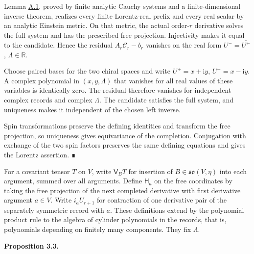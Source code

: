 \documentclass[
  english,
  11pt,
  reqno]{amsart}
\makeatletter
\newcommand{\pandocstatementheading}[1]{%
  \par\addpenalty{\@beginparpenalty}%
  \addvspace{.5\baselineskip plus .2\baselineskip minus .2\baselineskip}%
  {\normalfont\bfseries #1\par}%
  \nobreak\@afterindenttrue\@afterheading
}
\makeatother
\begin{document}
Lemma \hyperref[lem:es-finite-witness]{A.1}, proved by finite analytic
Cauchy systems and a finite-dimensional inverse theorem, realizes every
finite Lorentz-real prefix and every real scalar by an analytic Einstein
metric. On that metric, the actual order-\(r\) derivative solves the
full system and has the prescribed free projection. Injectivity makes it
equal to the candidate. Hence the residual \(A_r\mathcal C_r-b_r\)
vanishes on the real form \(U^-=\overline{U^+}\),
\(\Lambda\in\mathbb R\).

Choose paired bases for the two chiral spaces and write
\(U^+=x+\mathrm i y\), \(U^-=x-\mathrm i y\). A complex polynomial in
\((x,y,\Lambda)\) that vanishes for all real values of these variables
is identically zero. The residual therefore vanishes for independent
complex records and complex \(\Lambda\). The candidate satisfies the
full system, and uniqueness makes it independent of the chosen left
inverse.

Spin transformations preserve the defining identities and transform the
free projection, so uniqueness gives equivariance of the completion.
Conjugation with exchange of the two spin factors preserves the same
defining equations and gives the Lorentz assertion. ∎

For a covariant tensor \(T\) on \(V\), write \(\mathsf V_BT\) for
insertion of \(B\in\mathfrak{so}(V,\eta)\) into each argument, summed
over all arguments. Define \(\mathsf H_a\) on the free coordinates by
taking the free projection of the next completed derivative with first
derivative argument \(a\in V\). Write \(i_aU_{r+1}\) for contraction of
one derivative pair of the separately symmetric record with \(a\). These
definitions extend by the polynomial product rule to the algebra of
cylinder polynomials in the records, that is, polynomials depending on
finitely many components. They fix \(\Lambda\).

\pandocstatementheading{\protect{}\label{prop:es-polynomial-derivations}Proposition 3.3.}
\end{document}
